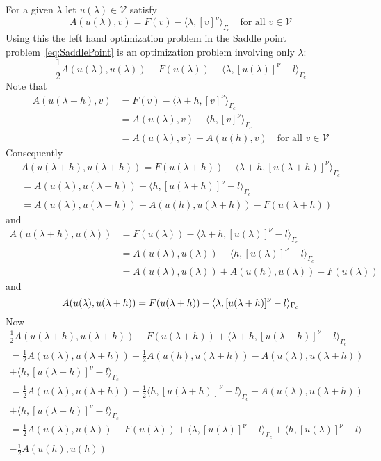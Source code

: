 \documentclass[12pt,a4paper]{article}
\numberwithin{equation}{section}
\numberwithin{table}{section}
\numberwithin{figure}{section}
\newcommand{\half}{\ensuremath{\frac{1}{2}}}
\newcommand{\V}{\ensuremath{\mathcal{V}}}
\providecommand{\dualp}[2]{\langle #1, #2 \rangle}
\newcommand{\ulambda}{\ensuremath{u(\lambda)}}
\newcommand{\ulambdah}{\ensuremath{u(\lambda+h)}}
\newcommand{\ulh}{\ensuremath{u(h)}}
\newcommand{\qforall}{\quad\text{for all }}
\begin{document}
For a given $\lambda$ let $\ulambda\in \V$ satisfy
\begin{equation}
  A(\ulambda, v) = F(v) - \dualp{\lambda}{[v]^\nu}_{\Gamma_c}
  \qforall v\in \V
\end{equation}
Using this the left hand optimization problem in the Saddle point
problem~\ref{eq:SaddlePoint} is an optimization problem involving only $\lambda$:
\begin{equation}
\half A(\ulambda,\ulambda) - F(\ulambda) + \dualp{\lambda}{[\ulambda]^\nu - l}_{\Gamma_c}  
\end{equation}
Note that
\begin{align}
  A(\ulambdah, v) &= F(v) - \dualp{\lambda+h}{[v]^\nu}_{\Gamma_c} \\
  &= A(\ulambda, v) - \dualp{h}{[v]^\nu}_{\Gamma_c} \\
  &= A(\ulambda, v) + A(\ulh,v)
  \qforall v\in \V
\end{align}
Consequently
\begin{multline}
  A(\ulambdah, \ulambdah) = F(\ulambdah) - \dualp{\lambda+h}{[\ulambdah]^\nu}_{\Gamma_c} \\
  = A(\ulambda, \ulambdah) - \dualp{h}{[\ulambdah]^\nu - l}_{\Gamma_c} \\
  = A(\ulambda, \ulambdah) + A(\ulh,\ulambdah) - F(\ulambdah)
\end{multline}
and
\begin{align}
  A(\ulambdah, \ulambda) &= F(\ulambda) - \dualp{\lambda+h}{[\ulambda]^\nu - l}_{\Gamma_c} \\
  &= A(\ulambda, \ulambda) - \dualp{h}{[\ulambda]^\nu - l}_{\Gamma_c} \\
  &= A(\ulambda, \ulambda) + A(\ulh,\ulambda) - F(\ulambda)
\end{align}
and
\begin{equation}
  A(\ulambda, \ulambdah) = F(\ulambdah) - \dualp{\lambda}{[\ulambdah]^\nu - l}_{\Gamma_c} \\
\end{equation}
Now
\begin{multline*}
  \half A(\ulambdah,\ulambdah) - F(\ulambdah) + \dualp{\lambda+h}{[\ulambdah]^\nu -
    l}_{\Gamma_c}  \\
  = \half A(\ulambda,\ulambdah) + \half A(\ulh, \ulambdah) - A(\ulambda, \ulambdah) \\
  + \dualp{h}{[\ulambdah]^\nu-l}_{\Gamma_c}  \\
  = \half A(\ulambda, \ulambdah) - \half\dualp{h}{[\ulambdah]^\nu - l}_{\Gamma_c}
  -  A(\ulambda, \ulambdah) \\+ \dualp{h}{[\ulambdah]^\nu -
    l}_{\Gamma_c}  \\
  =   \half A(\ulambda,\ulambda) - F(\ulambda)  + \dualp{\lambda}{[\ulambda]^\nu -
    l}_{\Gamma_c} + \dualp{h}{[\ulambda]^\nu-l} \\ -\half A(\ulh,\ulh)
\end{multline*}
\end{document}
